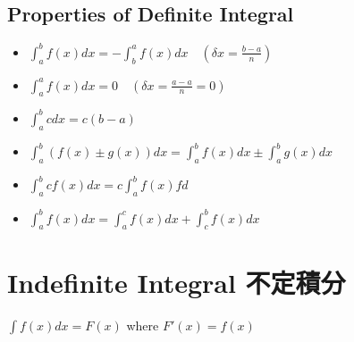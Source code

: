 \subsection*{Properties of Definite Integral}
\begin{itemize}
\item $\displaystyle \int_a^b f(x) dx = - \int_b^a f(x)dx \quad (\delta x = \frac{b-a}{n})$ 
\item $\displaystyle \int_a^a f(x) dx = 0 \quad (\delta x = \frac{a-a}{n} = 0)$
\item $\displaystyle \int_a^b c dx= c(b-a)$
\item $\displaystyle \int_a^b (f(x) \pm g(x))dx = \int_a^b f(x) dx \pm \int_a^b g(x)dx$
\item $\displaystyle \int_a^b cf(x)dx = c \int_a^b f(x)fd$
\item $\displaystyle \int_a^b f(x)dx = \int_a^cf(x)dx + \int_c^b f(x) dx$
\end{itemize}
\section{Indefinite Integral 不定積分}
\begin{defn}
$\displaystyle \int f(x) dx = F(x)$ where $F'(x) = f(x)$
\end{defn}
